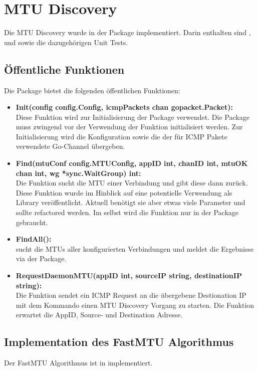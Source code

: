 \section{MTU Discovery}
\label{sec:MTU Discovery}

Die \ac{MTU} Discovery wurde in der  Package implementiert. Darin enthalten sind ,  und  sowie die dazugehörigen Unit Tests.

\subsection{Öffentliche Funktionen}
Die  Package bietet die folgenden öffentlichen Funktionen:

\begin{itemize}
\item \textbf{Init(config config.Config, icmpPackets chan gopacket.Packet):} \\
Diese Funktion wird zur Initialisierung der  Package verwendet. Die Package muss zwingend vor der Verwendung der  Funktion initialisiert werden. Zur Initialisierung wird die Konfiguration sowie die der für \ac{ICMP} Pakete verwendete Go-Channel übergeben.
\item \textbf{Find(mtuConf config.MTUConfig, appID int, chanID int, mtuOK chan int, wg *sync.WaitGroup) int:} \\
Die  Funktion sucht die \ac{MTU} einer Verbindung und gibt diese dann zurück. Diese Funktion wurde im Hinblick auf eine potentielle Verwendung als Library veröffentlicht. Aktuell benötigt sie aber etwas viele Parameter und sollte refactored werden. Im \tool{} selbst wird die Funktion nur in der  Package gebraucht.
\item \textbf{FindAll():} \\
 sucht die \ac{MTU}s aller konfigurierten Verbindungen und meldet die Ergebnisse via der  Package.
\item \textbf{RequestDaemonMTU(appID int, sourceIP string, destinationIP string):} \\
Die Funktion  sendet ein ICMP Request an die übergebene Destionation IP mit dem Kommando einen \ac{MTU} Discovery Vorgang zu starten. Die Funktion erwartet die AppID, Source- und Destination Adresse.
\end{itemize}

\subsection{Implementation des FastMTU Algorithmus}
Der FastMTU Algorithmus ist in  implementiert. 


